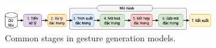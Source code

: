 

\begin{figure}[H]
	\centering
	\includegraphics[width=0.8\textwidth]{images/CommonStage.png}
	\caption{Common stages in gesture generation models.}
	\Description{}
	\label{fig:CommonStage}
\end{figure}

